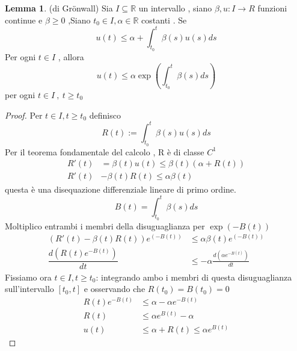 \documentclass{article}
\theoremstyle{definition}
\newtheorem*{lemma}{Lemma}
\newcommand{\R}{\mathbb{R}}
\begin{document}
\begin{lemma}(di Grönwall)\newline
Sia $I \subseteq \R$ un intervallo , siano $\beta , u : I \rightarrow R$ funzioni continue e $\beta \geq 0$ ,Siano  $t_0 \in I , \alpha \in \R$ costanti  . Se  
$$u(t)\leq \alpha + \int_{t_0}^{t} \beta (s) u(s)ds$$
Per ogni $t\in I $ , allora 
$$u(t)\leq \alpha \exp \left( \int_{t_0}^{t} \beta(s)ds \right)$$
per ogni $t \in I \ , \ t\geq t_0 $ 
 \end{lemma}
 \begin{proof}
 	Per $t\in I , t \geq t_0$ definisco 
 	$$R(t):= \int_{t_0}^{t}\beta (s)u(s)ds$$
 	Per il teorema fondamentale del calcolo , R è di classe $C^1$ 
 	\begin{align*}
 	R'(t)&=\beta (t)u(t)\leq \beta(t)(\alpha + R(t)) \\
 	R'(t)&-\beta (t)R(t)\leq \alpha \beta (t)
 \end{align*}
 questa è una disequazione differenziale  lineare di primo ordine. 
 $$B(t)=\int_{t_0}^{t}\beta(s)ds$$
 Moltiplico entrambi i membri della disuguaglianza per $\exp(-B(t))$
 \begin{align*}
 	(R'(t)-\beta (t)R(t))e^{(-B(t))}&\leq \alpha \beta (t)e^{(-B(t))} \\
 	\dfrac{d(R(t)e^{-B(t)})}{dt}& \leq -\alpha \frac{d(\alpha e^{-B(t)})}{dt}
 \end{align*}
 Fissiamo ora $t \in I , t \geq t_0$: integrando ambo i membri di questa disuguaglianza sull'intervallo $\left[t_0,t\right]$ e osservando che $R(t_0)=B(t_0)=0$
 \begin{align*}
 	R(t)e^{-B(t)} &\leq \alpha - \alpha e^{-B(t)}\\
 	R(t) & \leq \alpha e^{B(t)} - \alpha  \\
 	u(t) & \leq \alpha + R(t) \leq \alpha e^{B(t)}
 	 \end{align*}
 \end{proof}
\end{document}
